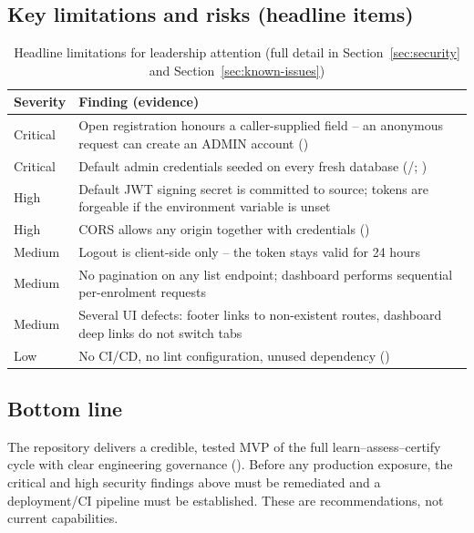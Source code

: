 \subsection{Key limitations and risks (headline items)}

\begin{table}[H]
\centering
\caption{Headline limitations for leadership attention (full detail in Section~\ref{sec:security} and Section~\ref{sec:known-issues})}
\label{tab:exec-risks}
\begin{tabular}{@{}C{2.0cm}L{11.6cm}@{}}
\toprule
\textbf{Severity} & \textbf{Finding (evidence)} \\
\midrule
Critical & Open registration honours a caller-supplied  field -- an anonymous request can create an ADMIN account () \\
Critical & Default admin credentials seeded on every fresh database (/; ) \\
High & Default JWT signing secret is committed to source; tokens are forgeable if the environment variable is unset \\
High & CORS allows any origin together with credentials () \\
Medium & Logout is client-side only -- the token stays valid for 24 hours \\
Medium & No pagination on any list endpoint; dashboard performs sequential per-enrolment requests \\
Medium & Several UI defects: footer links to non-existent routes, dashboard deep links do not switch tabs \\
Low & No CI/CD, no lint configuration, unused dependency () \\
\bottomrule
\end{tabular}
\end{table}

\subsection{Bottom line}

The repository delivers a credible, tested MVP of the full learn--assess--certify cycle with clear engineering governance (). Before any production exposure, the critical and high security findings above must be remediated and a deployment/CI pipeline must be established. These are recommendations, not current capabilities.
